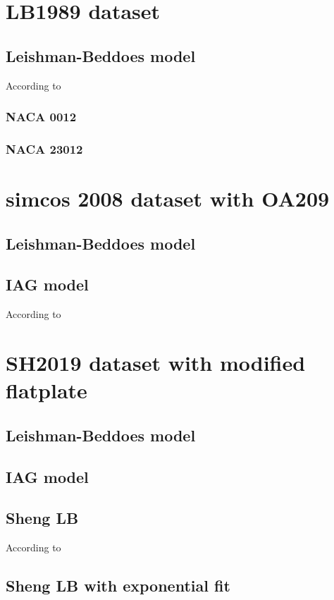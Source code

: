 

\section{LB1989 dataset}

\subsection{Leishman-Beddoes model}

According to \cite{leishman_semi-empirical_1989}

\subsubsection{NACA 0012}

\subsubsection{NACA 23012}

\section{simcos 2008 dataset with OA209}

\subsection{Leishman-Beddoes model}

\subsection{IAG model}

According to \cite{bangga_improved_2020}

\section{SH2019 dataset with modified flatplate}

\subsection{Leishman-Beddoes model}

\subsection{IAG model}

\subsection{Sheng LB}

According to \cite{sheng_modified_2008}

\subsection{Sheng LB with exponential fit}
